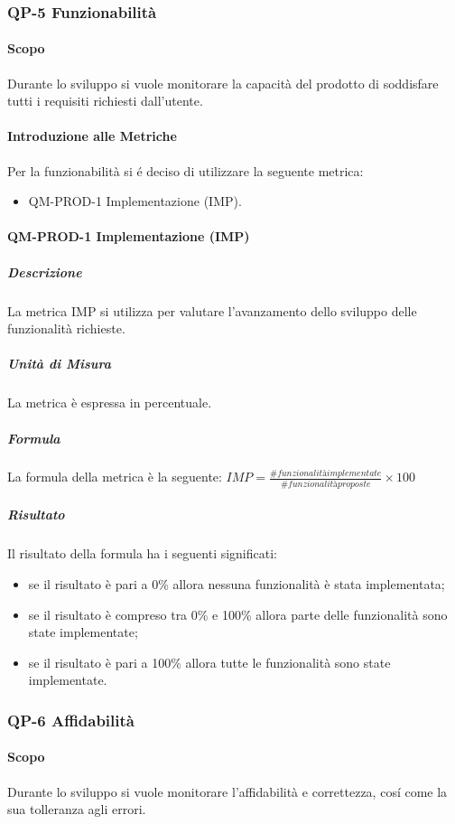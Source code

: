 	\subsubsection{QP-5 Funzionabilità}
		\paragraph{Scopo}
			Durante lo sviluppo si vuole monitorare la capacità del prodotto di soddisfare tutti i requisiti richiesti dall'utente.
		\paragraph{Introduzione alle Metriche}
			Per la funzionabilità si é deciso di utilizzare la seguente metrica:
			\begin{itemize}
				\item QM-PROD-1 Implementazione (IMP).
			\end{itemize}
		\paragraph{QM-PROD-1 Implementazione (IMP)}
			\subparagraph{Descrizione}
				La metrica IMP si utilizza per valutare l'avanzamento dello sviluppo delle funzionalità richieste.
			\subparagraph{Unità di Misura}
				La metrica è espressa in percentuale.
			\subparagraph{Formula}
				La formula della metrica è la seguente:
				\(
					IMP = \frac{\# funzionalità implementate}{\# funzionalità proposte}\times100
				\)
			\subparagraph{Risultato}
				Il risultato della formula ha i seguenti significati:
				\begin{itemize}
					\item se il risultato è pari a 0\% allora nessuna funzionalità è stata implementata;
					\item se il risultato è compreso tra 0\% e 100\% allora parte delle funzionalità sono state implementate;
					\item se il risultato è pari a 100\% allora tutte le funzionalità sono state implementate.
				\end{itemize}

	\subsubsection{QP-6 Affidabilità}
		\paragraph{Scopo}
		Durante lo sviluppo si vuole monitorare l'affidabilità e correttezza, cosí come la sua tolleranza agli errori.
